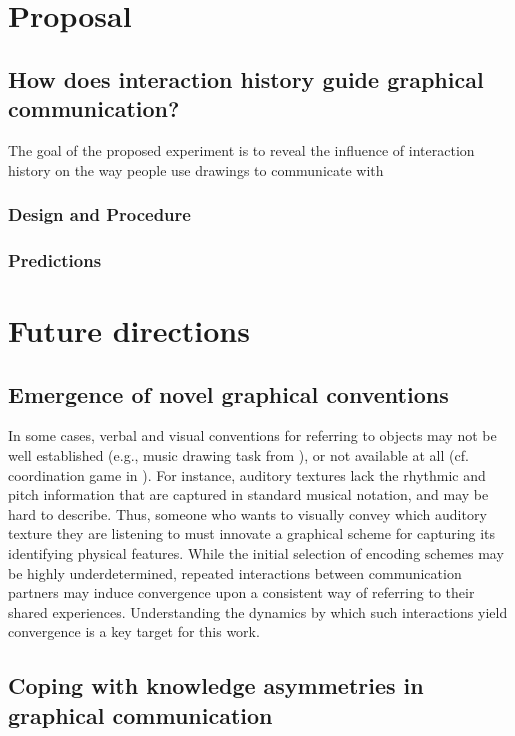 \documentclass[12pt]{article}
\begin{document}
\section{Proposal}

\subsection{How does interaction history guide graphical communication?}

The goal of the proposed experiment is to reveal the influence of interaction history on the way people use drawings to communicate with 


\subsubsection{Design and Procedure}

\subsubsection{Predictions}

\section{Future directions}

\subsection{Emergence of novel graphical conventions}

In some cases, verbal and visual conventions for referring to objects may not be well established (e.g., music drawing task from ), or not available at all (cf. coordination game in ). For instance, auditory textures \cite{McDermott:2013ky} lack the rhythmic and pitch information that are captured in standard musical notation, and may be hard to describe. Thus, someone who wants to visually convey which auditory texture they are listening to must innovate a graphical scheme for capturing its identifying physical features. While the initial selection of encoding schemes may be highly underdetermined, repeated interactions between communication partners may induce convergence upon a consistent way of referring to their shared experiences. Understanding the dynamics by which such interactions yield convergence is a key target for this work. 

\subsection{Coping with knowledge asymmetries in graphical communication}
\end{document}
